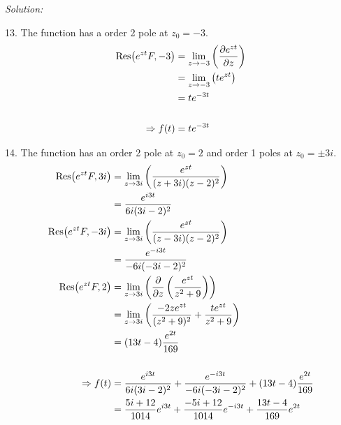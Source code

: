 \documentclass[11pt]{homework}
\begin{document}
\emph{Solution:}
\newline

13. The function has a order 2 pole at $z_0=-3$.
\begin{align*}
\Res( e^{zt} F, -3) 
  &= \lim_{z\to -3} \left( \pdv{e^{zt}}{z} \right) \\
  &= \lim_{z\to -3} \left( te^{zt} \right) \\
  &= te^{-3t} \\
\\
\Rightarrow
f(t) &= te^{-3t} 
\end{align*}

14. The function has an order 2 pole at $z_0=2$ and order 1 poles at $z_0=\pm3i$.
\begin{align*}
\Res( e^{zt}F, 3i) 
  &= \lim_{z\to 3i} \left( \frac{e^{zt}}{(z+3i)(z-2)^2} \right) \\
  &= \frac{e^{i3t}}{6i(3i-2)^2} \\
\Res( e^{zt}F, -3i) 
  &= \lim_{z\to 3i} \left( \frac{e^{zt}}{(z-3i)(z-2)^2} \right) \\
  &= \frac{e^{-i3t}}{-6i(-3i-2)^2} \\
\Res( e^{zt}F, 2) 
  &= \lim_{z\to 3i} \left( \frac{\partial}{\partial z}\left( \frac{e^{zt}}{z^2+9} \right) \right)  \\ 
  &= \lim_{z\to 3i} \left( \frac{-2ze^{zt}}{(z^2+9)^2} + \frac{te^{zt}}{z^2+9}  \right)  \\ 
  &= (13t-4) \frac{e^{2t}}{169} \\
\\
\Rightarrow
f(t) 
  &= \frac{e^{i3t}}{6i(3i-2)^2} + \frac{e^{-i3t}}{-6i(-3i-2)^2} + (13t-4) \frac{e^{2t}}{169} \\
  &= \frac{5i+12}{1014} e^{i3t} + \frac{-5i+12}{1014} e^{-i3t} +\frac{13t-4}{169} e^{2t}
\end{align*}
\end{document}
